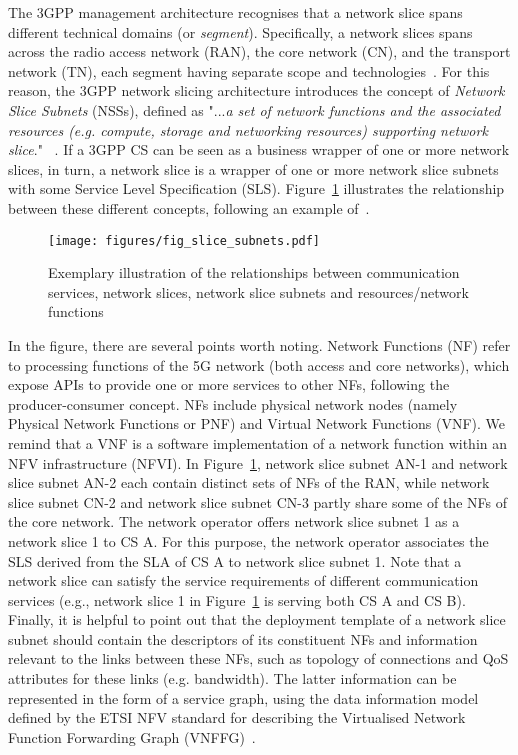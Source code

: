 The 3GPP management architecture recognises that a network slice spans different technical domains (or \textit{segment}). Specifically, a network slices spans across the radio access network (RAN), the core network (CN), and the transport network (TN), each segment having separate scope and technologies~\cite{2021_gsma_TR_e2eslicing}. For this reason, the 3GPP network slicing architecture introduces the concept of \textit{Network Slice Subnets} (NSSs), defined as "...\textit{a set of network functions and the associated resources (e.g. compute, storage and networking resources) supporting network slice}." ~\cite{3GPPTS28530}. If a 3GPP CS can be seen as a business wrapper of one or more network slices, in turn, a network slice is a wrapper of one or more network slice subnets with some Service Level Specification (SLS). Figure~\ref{fig:slice_subnet} illustrates the relationship between these different concepts, following an example of~\cite{3GPPTS28530}.
%
\begin{figure}[ht]
\centering
\texttt{[image: figures/fig\_slice\_subnets.pdf]}
\caption{Exemplary illustration of the relationships between communication services, network slices, network slice subnets and resources/network functions}
\label{fig:slice_subnet}
\end{figure}
%
In the figure, there are several points worth noting. Network Functions (NF) refer to processing functions of the 5G network (both access and core networks), which expose APIs to provide one or more services to other NFs, following the producer-consumer concept. NFs include physical network nodes (namely Physical Network Functions or PNF) and Virtual Network Functions (VNF). We remind that a VNF is a software implementation of a network function within an NFV infrastructure (NFVI). In Figure~\ref{fig:slice_subnet}, network slice subnet AN-1 and network slice subnet AN-2 each contain distinct sets of NFs of the RAN, while network slice subnet CN-2 and network slice subnet CN-3 partly share some of the NFs of the core network. The network operator offers network slice subnet 1 as a network slice 1 to CS A. For this purpose, the network operator associates the SLS derived from the SLA of CS A to network slice subnet 1. Note that a network slice can satisfy the service requirements of different communication services (e.g., network slice 1 in Figure~\ref{fig:slice_subnet} is serving both CS A and CS B). Finally, it is helpful to point out that the deployment template of a network slice subnet should contain the descriptors of its constituent NFs and information relevant to the links between these NFs, such as topology of connections and QoS attributes for these links (e.g. bandwidth). The latter information can be represented in the form of a service graph, using the data information model defined by the ETSI NFV standard for describing the Virtualised Network Function Forwarding Graph (VNFFG)~\cite{NFV012}.
